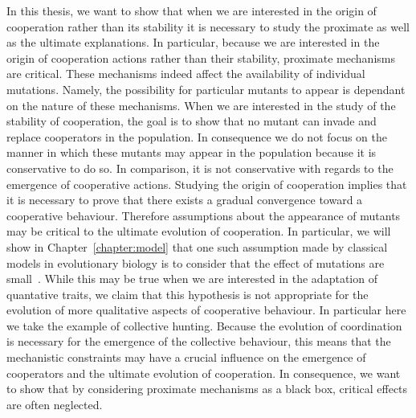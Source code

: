     In this thesis, we want to show that when we are interested in the origin of cooperation rather than its stability it is necessary to study the proximate as well as the ultimate explanations. In particular, because we are interested in the origin of cooperation actions rather than their stability, proximate mechanisms are critical. These mechanisms indeed affect the availability of individual mutations. Namely, the possibility for particular mutants to appear is dependant on the nature of these mechanisms. When we are interested in the study of the stability of cooperation, the goal is to show that no mutant can invade and replace cooperators in the population. In consequence we do not focus on the manner in which these mutants may appear in the population because it is conservative to do so. In comparison, it is not conservative with regards to the emergence of cooperative actions. Studying the origin of cooperation implies that it is necessary to prove that there exists a gradual convergence toward a cooperative behaviour. Therefore assumptions about the appearance of mutants may be critical to the ultimate evolution of cooperation. In particular, we will show in Chapter~\ref{chapter:model} that one such assumption made by classical models in evolutionary biology is to consider that the effect of mutations are small~\parencite{Geritz1998, McGill2007}. While this may be true when we are interested in the adaptation of quantative traits, we claim that this hypothesis is not appropriate for the evolution of more qualitative aspects of cooperative behaviour. In particular here we take the example of collective hunting. Because the evolution of coordination is necessary for the emergence of the collective behaviour, this means that the mechanistic constraints may have a crucial influence on the emergence of cooperators and the ultimate evolution of cooperation. In consequence, we want to show that by considering proximate mechanisms as a black box, critical effects are often neglected.



